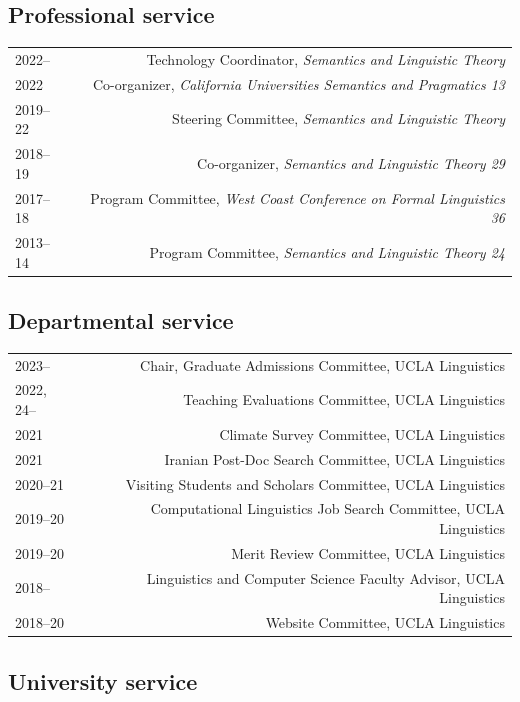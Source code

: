\documentclass[12pt]{article}
\begin{document}
\subsection*{Professional service}

\begin{longtable}{LR}
  2022--     & Technology Coordinator, \textit{Semantics and Linguistic Theory}\\
  2022       & Co-organizer, \textit{California Universities Semantics and
               Pragmatics 13}\\
  2019--22   & Steering Committee, \textit{Semantics and Linguistic Theory}\\
  2018--19   & Co-organizer, \textit{Semantics and Linguistic Theory 29}\\
  2017--18   & Program Committee, \textit{West Coast Conference on Formal
               Linguistics 36}\\
  2013--14   & Program Committee, \textit{Semantics and Linguistic Theory 24}
\end{longtable}

\subsection*{Departmental service}

\begin{longtable}{LR}
  2023--     & Chair, Graduate Admissions Committee, UCLA Linguistics\\
  2022, 24-- & Teaching Evaluations Committee, UCLA Linguistics\\
  2021       & Climate Survey Committee, UCLA Linguistics\\
  2021       & Iranian Post-Doc Search Committee, UCLA Linguistics\\
  2020--21   & Visiting Students and Scholars Committee, UCLA Linguistics\\
  2019--20   & Computational Linguistics Job Search Committee, UCLA Linguistics\\
  2019--20   & Merit Review Committee, UCLA Linguistics\\
  2018--     & Linguistics and Computer Science Faculty Advisor, UCLA Linguistics\\
  2018--20   & Website Committee, UCLA Linguistics
\end{longtable}

\subsection*{University service}
\end{document}
